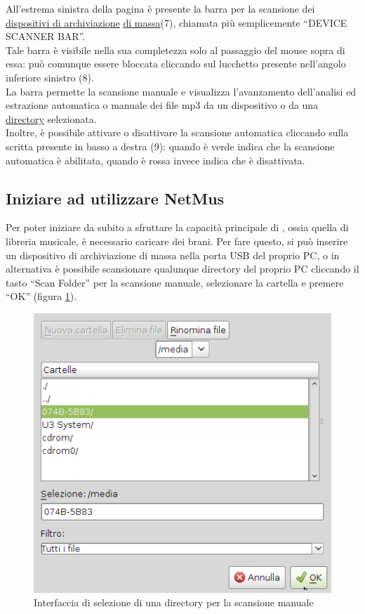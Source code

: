 All'estrema sinistra della pagina \`e presente la barra per la scansione
dei \underline{dispositivi di archiviazione} \underline{di massa}(7), chiamata
pi\`u semplicemente ``DEVICE SCANNER BAR''.\\ 
Tale barra \`e visibile nella sua completezza solo al passaggio del mouse sopra
di essa: pu\`o comunque essere bloccata cliccando sul lucchetto presente
nell'angolo inferiore sinistro (8).\\
La barra permette la scansione manuale e visualizza l'avanzamento dell'analisi
ed estrazione automatica o manuale dei file mp3 da un dispositivo o da una \underline{directory} selezionata.\\
Inoltre, \`e possibile attivare o disattivare la scansione automatica cliccando
sulla scritta presente in basso a destra (9): quando \`e verde indica che la
scansione automatica \`e abilitata, quando \`e rossa invece indica che \`e
disattivata.

\newpage
\subsection{Iniziare ad utilizzare NetMus}

Per poter iniziare da subito a sfruttare la capacit\`a principale di ,
ossia quella di libreria musicale, \`e necessario caricare dei brani.
Per fare questo, si pu\`o inserire un dispositivo di archiviazione di massa
nella porta USB del proprio PC, o in alternativa \`e possibile scansionare
qualunque directory del proprio PC cliccando il tasto ``Scan Folder'' per la scansione manuale,
selezionare la cartella e premere ``OK'' (figura \ref{fig:scansioneManuale}).\\
\begin{figure}[!htbp]
  \centering
  \includegraphics[width=14cm]{img/MU/scan_manual.png}
\caption{Interfaccia di selezione di una directory per la scansione
manuale}
\label{fig:scansioneManuale}
\end{figure}

